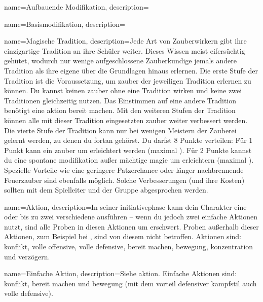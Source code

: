 {
    name={Aufbauende Modifikation},
    description={}}

{
    name={Basismodifikation},
    description={}}

{
    name={Magische Tradition},
    description={Jede Art von Zauberwirkern gibt ihre einzigartige Tradition an ihre Schüler weiter. Dieses Wissen meist eifersüchtig gehütet, wodurch nur wenige aufgeschlossene Zauberkundige jemals andere Tradition als ihre eigene über die Grundlagen hinaus erlernen. Die erste Stufe der Tradition ist die Voraussetzung, um \gls{zauber} der jeweiligen Tradition erlernen zu können. Du kannst keinen \gls{zauber} ohne eine Tradition wirken und keine zwei Traditionen gleichzeitig nutzen. Das Einstimmen auf eine andere Tradition benötigt eine \gls{aktion} \gls{bereit machen}. Mit den weiteren Stufen der Tradition können alle mit dieser Tradition eingesetzten \gls{zauber} weiter verbessert werden. Die vierte Stufe der Tradition kann nur bei wenigen Meistern der Zauberei gelernt werden, zu denen du fortan gehörst. Du darfst 8 Punkte verteilen: Für 1 Punkt kann ein \gls{zauber} um  erleichtert werden (maximal ). Für 2 Punkte kannst du eine \gls{spontane modifikation} außer \gls{mächtige magie} um  erleichtern (maximal ). Spezielle Vorteile wie eine geringere Patzerchance oder länger nachbrennende Feuerzauber sind ebenfalls möglich. Solche Verbesserungen (und ihre Kosten) sollten mit dem Spielleiter und der Gruppe abgesprochen werden.}}
        
            
    

{
    name={Aktion},
    description={In seiner \gls{initiativephase} kann dein Charakter eine  oder bis zu zwei verschiedene  ausführen – wenn du jedoch zwei einfache Aktionen nutzt, sind alle Proben in diesen Aktionen um  erschwert. Proben außerhalb dieser Aktionen, zum Beispiel bei , sind von diesem  nicht betroffen. Aktionen sind: \gls{konflikt}, \gls{volle offensive}, \gls{volle defensive}, \gls{bereit machen}, \gls{bewegung}, \gls{konzentration} und \gls{verzögern}.}}

{
    name={Einfache Aktion},
    description={Siehe \gls{aktion}. Einfache Aktionen sind: \gls{konflikt}, \gls{bereit machen} und \gls{bewegung} (mit dem \gls{vorteil} \gls{defensiver kampfstil} auch \gls{volle defensive}).}}

